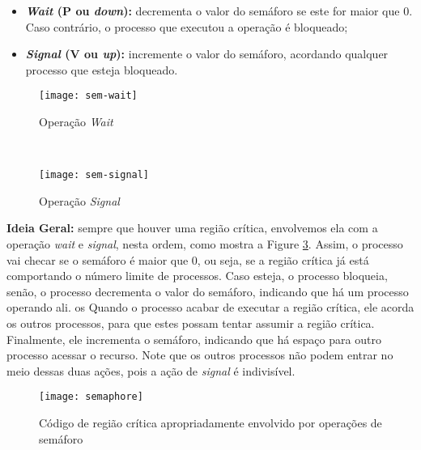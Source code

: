 \begin{itemize}
  \item \textbf{\textit{Wait} (P ou \textit{down}):} decrementa o valor do semáforo se este for maior que 0. Caso contrário, o processo que executou a operação é bloqueado;

  \item \textbf{\textit{Signal} (V ou \textit{up}):} incremente o valor do semáforo, acordando qualquer processo que esteja bloqueado.
\end{itemize}

\begin{figure*}[ht]

  \begin{subfigure}[t]{.5\textwidth}
    \centering
    \texttt{[image: sem-wait]}
    \caption{Operação \textit{Wait}}
    \label{subfig:sem-wait}
  \end{subfigure}
  ~
  \begin{subfigure}[t]{.5\textwidth}
    \centering
    \texttt{[image: sem-signal]}
    \caption{Operação \textit{Signal}}
    \label{subfig:sem-wait}
  \end{subfigure}

  \caption{Operações de semáforos}
  \label{fig:sem-ops}
\end{figure*}

\textbf{Ideia Geral:} sempre que houver uma região crítica, envolvemos ela com a operação \textit{wait} e \textit{signal}, nesta ordem, como mostra a Figure \ref{fig:semaphore}. Assim, o processo vai checar se o semáforo é maior que 0, ou seja, se a região crítica já está comportando o número limite de processos. Caso esteja, o processo bloqueia, senão, o processo decrementa o valor do semáforo, indicando que há um processo operando ali.
os
Quando o processo acabar de executar a região crítica, ele acorda os outros processos, para que estes possam tentar assumir a região crítica. Finalmente, ele incrementa o semáforo, indicando que há espaço para outro processo acessar o recurso. Note que os outros processos não podem entrar no meio dessas duas ações, pois a ação de \textit{signal} é indivisível.


\begin{figure}[ht]
  \centering
  \texttt{[image: semaphore]}
  \caption{Código de região crítica apropriadamente envolvido por operações de semáforo}
  \label{fig:semaphore}
\end{figure}






